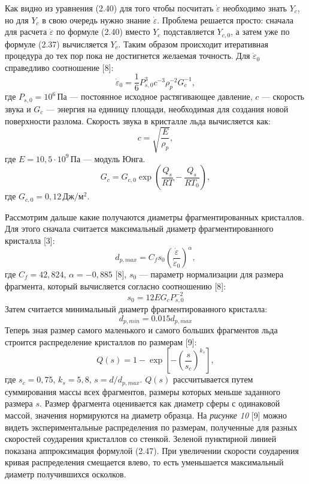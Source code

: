 Как видно из уравнения (2.40) для того чтобы посчитать $\dot{\varepsilon}$ необходимо знать $Y_c$, но для $Y_c$ в свою очередь нужно знание $\dot{\varepsilon}$. Проблема решается просто: сначала для расчета $\dot{\varepsilon}$ по формуле (2.40) вместо $Y_c$ подставляется $Y_{c,0}$, а затем уже по формуле (2.37) вычисляется $Y_c$. Таким образом происходит итеративная процедура до тех пор пока не достигнется желаемая точность. Для $\dot{\varepsilon}_0$ справедливо соотношение [8]:
\begin{equation}
	\dot{\varepsilon}_0 = \frac{1}{6} P_{s,0}^3 c^{-3} \rho_p^{-2} G_c^{-1},
\end{equation}
где $P_{s,0} = 10^6\, \text{Па}$ --- постоянное исходное растягивающее давление, $c$ --- скорость звука и $G_c$ --- энергия на единицу площади, необходимая для создания новой поверхности разлома. Скорость звука в кристалле льда вычисляется как:
\begin{equation}
	c = \sqrt{\frac{E}{\rho_p}},
\end{equation}
где $E = 10{,}5 \cdot 10^9\,\text{Па}$ --- модуль Юнга.
\begin{equation}
	G_c = G_{c,0} \exp \left(\frac{Q_s}{R T}-\frac{Q_s}{R T_0}\right),
\end{equation}
где $G_{c,0} = 0{,}12\,\text{Дж}/\text{м}^2$.

Рассмотрим дальше какие получаются диаметры фрагментированных кристаллов. Для этого сначала считается максимальный диаметр фрагментированного кристалла [3]:
\begin{equation}
	d_{p,max}=C_f s_0 \left(\frac{\dot{\varepsilon}}{\dot{\varepsilon}_0}\right)^\alpha,
\end{equation}
где $C_f= 42{,}824$, $\alpha=-0{,}885$ [8], $s_0$ --- параметр нормализации для размера фрагмента, который вычисляется согласно соотношению [8]:
\begin{equation}
	s_0=12 E G_c P_{s,0}^{-2}
\end{equation}
Затем считается минимальный диаметр фрагментированного кристалла:
\begin{equation}
	d_{p,min}=0.015 d_{p,max}
\end{equation}
Теперь зная размер самого маленького и самого больших фрагментов льда строится распределение кристаллов по размерам [9]:
\begin{equation}
	Q(s)=1-\exp\left[-\left(\frac{s}{s_c}\right)^{k_s}\right],
\end{equation}
где $s_c=0{,}75$, $k_s=5{,}8$, $s = d/d_{p,max}$. $Q(s)$ рассчитывается путем суммирования массы
всех фрагментов, размеры которых меньше заданного размера $s$. Размер
фрагмента оценивается как диаметр сферы с одинаковой
массой, значения нормируются на диаметр образца. На \textit{рисунке 10} [9] можно видеть экспериментальные распределения по размерам, полученные для разных скоростей соударения кристаллов со стенкой. Зеленой пунктирной линией показана аппроксимация формулой (2.47). При увеличении скорости соударения кривая распределения смещается влево, то есть уменьшается максимальный диаметр получившихся осколков.

